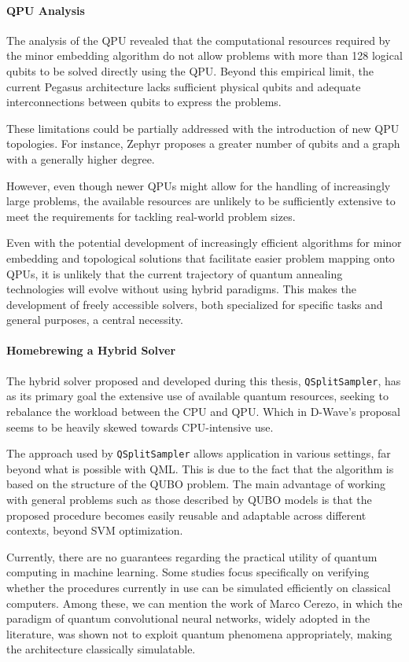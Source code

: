 \paragraph{QPU Analysis} The analysis of the QPU revealed that the computational resources required by the minor embedding algorithm do not allow problems with more than 128 logical qubits to be solved directly using the QPU. 
Beyond this empirical limit, the current Pegasus architecture lacks sufficient physical qubits and adequate interconnections between qubits to express the problems.

These limitations could be partially addressed with the introduction of new QPU topologies. 
For instance, Zephyr proposes a greater number of qubits and a graph with a generally higher degree.

However, even though newer QPUs might allow for the handling of increasingly large problems, the available resources are unlikely to be sufficiently extensive to meet the requirements for tackling real-world problem sizes. 

Even with the potential development of increasingly efficient algorithms for minor embedding and topological solutions that facilitate easier problem mapping onto QPUs, it is unlikely that the current trajectory of quantum annealing technologies will evolve without using hybrid paradigms. 
This makes the development of freely accessible solvers, both specialized for specific tasks and general purposes, a central necessity.

\paragraph{Homebrewing a Hybrid Solver} The hybrid solver proposed and developed during this thesis, \texttt{QSplitSampler}, has as its primary goal the extensive use of available quantum resources, seeking to rebalance the workload between the CPU and QPU.
Which in D-Wave's proposal seems to be heavily skewed towards CPU-intensive use.

The approach used by \texttt{QSplitSampler} allows application in various settings, far beyond what is possible with QML. 
This is due to the fact that the algorithm is based on the structure of the QUBO problem.
The main advantage of working with general problems such as those described by QUBO models is that the proposed procedure becomes easily reusable and adaptable across different contexts, beyond SVM optimization.

Currently, there are no guarantees regarding the practical utility of quantum computing in machine learning. 
Some studies focus specifically on verifying whether the procedures currently in use can be simulated efficiently on classical computers. 
Among these, we can mention the work of Marco Cerezo\cite{qcnn}, in which the paradigm of quantum convolutional neural networks, widely adopted in the literature, was shown not to exploit quantum phenomena appropriately, making the architecture classically simulatable.


